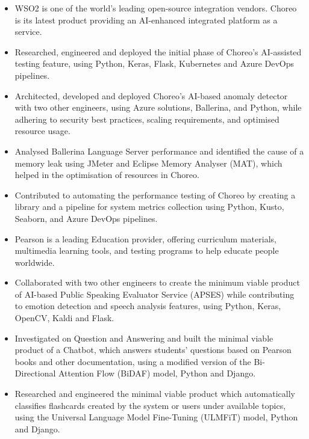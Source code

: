 \documentclass[10pt,a4paper,ragged2e,withhyper]{altacv}
\begin{document}
\begin{itemize}
    \item WSO2 is one of the world's leading open-source integration vendors. Choreo is its latest product providing an AI-enhanced integrated platform as a service. 
    \item Researched, engineered and deployed the initial phase of Choreo's AI-assisted testing feature, using Python, Keras, Flask, Kubernetes and Azure DevOps pipelines.
    \item Architected, developed and deployed Choreo’s AI-based anomaly detector with two other engineers, using Azure solutions, Ballerina, and Python, while adhering to security best practices, scaling requirements, and optimised resource usage.
    \item Analysed Ballerina Language Server performance and identified the cause of a memory leak using JMeter and Eclipse Memory Analyser (MAT), which helped in the optimisation of resources in Choreo.
    \item Contributed to automating the performance testing of Choreo by creating a library and a pipeline for system metrics collection using Python, Kusto, Seaborn, and Azure DevOps pipelines.
\end{itemize}

\divider{}

\begin{itemize}
    \item Pearson is a leading Education provider, offering curriculum materials, multimedia learning tools, and testing programs to help educate people worldwide.
    \item Collaborated with two other engineers to create the minimum viable product of AI-based Public Speaking Evaluator Service (APSES) while contributing to emotion detection and speech analysis features, using Python, Keras, OpenCV, Kaldi and Flask.
    \item Investigated on Question and Answering and built the minimal viable product of a Chatbot, which answers students' questions based on Pearson books and other documentation, using a modified version of the Bi-Directional Attention Flow (BiDAF) model, Python and Django.
    \item Researched and engineered the minimal viable product which automatically classifies flashcards created by the system or users under available topics, using the Universal Language Model Fine-Tuning (ULMFiT) model, Python and Django.
\end{itemize}
\end{document}
